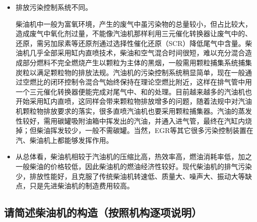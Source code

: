 \documentclass[UTF8]{ctexart}
\numberwithin{figure}{section}
\numberwithin{table}{section}
\begin{document}
\begin{itemize}
	\item 排放污染控制系统不同。

	      柴油机中一般为富氧环境，产生的废气中虽污染物的总量较小，但占比较大，造成废气中氧化剂过量，不能像汽油机那样利用三元催化转换器让废气中的、还原，需另加尿素等还原剂通过选择性催化还原（SCR）降低尾气中含量。柴油机几乎全部采用缸内直喷技术，柴油和空气混合时间很短，难以充分混合造成部分燃料不完全燃烧产生以颗粒为主体的黑烟，一般需用颗粒捕集系统捕集炭粒以满足颗粒物的排放法规。汽油机的污染控制系统稍显简单，现在一般通过空燃比的闭环控制令混合气始终保持在理论空燃比附近，这样在排气管中用一个三元催化转换器便能完成对尾气中、和的处理。目前越来越多的汽油机也开始采用缸内直喷，这同样会带来颗粒物排放增多的问题，随着法规中对汽油机颗粒物排放要求的落实，很多直喷汽油机也要采用颗粒捕集器。汽油的蒸发性较好，需用碳罐吸附油箱中挥发出的汽油，并通入进气管，最终在汽缸内烧掉；但柴油挥发较少，一般不需碳罐。当然，EGR等其它很多污染控制装置在汽、柴油机上都能够发挥作用。

	\item 从总体看，柴油机相较于汽油机的压缩比高，热效率高，燃油消耗率低，加之一般柴油的价格较低，因此柴油机的燃油经济性较好。现代柴油机的排气污染少，排放性能好，且克服了传统柴油机转速低、质量大、噪声大、振动大等缺点，只是先进柴油机的制造费用较高。
\end{itemize}

\subsection{请简述柴油机的构造（按照机构逐项说明）}
\end{document}
